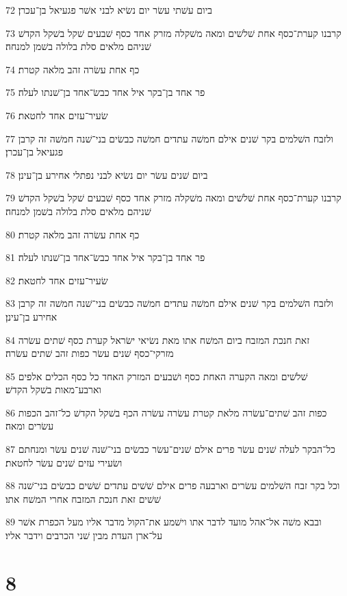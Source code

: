 \par 72 ביום עשׁתי עשׂר יום נשׂיא לבני אשׁר פגעיאל בן־עכרן׃
\par 73 קרבנו קערת־כסף אחת שׁלשׁים ומאה משׁקלה מזרק אחד כסף שׁבעים שׁקל בשׁקל הקדשׁ שׁניהם מלאים סלת בלולה בשׁמן למנחה׃
\par 74 כף אחת עשׂרה זהב מלאה קטרת׃
\par 75 פר אחד בן־בקר איל אחד כבשׂ־אחד בן־שׁנתו לעלה׃
\par 76 שׂעיר־עזים אחד לחטאת׃
\par 77 ולזבח השׁלמים בקר שׁנים אילם חמשׁה עתדים חמשׁה כבשׂים בני־שׁנה חמשׁה זה קרבן פגעיאל בן־עכרן׃
\par 78 ביום שׁנים עשׂר יום נשׂיא לבני נפתלי אחירע בן־עינן׃
\par 79 קרבנו קערת־כסף אחת שׁלשׁים ומאה משׁקלה מזרק אחד כסף שׁבעים שׁקל בשׁקל הקדשׁ שׁניהם מלאים סלת בלולה בשׁמן למנחה׃
\par 80 כף אחת עשׂרה זהב מלאה קטרת׃
\par 81 פר אחד בן־בקר איל אחד כבשׂ־אחד בן־שׁנתו לעלה׃
\par 82 שׂעיר־עזים אחד לחטאת׃
\par 83 ולזבח השׁלמים בקר שׁנים אילם חמשׁה עתדים חמשׁה כבשׂים בני־שׁנה חמשׁה זה קרבן אחירע בן־עינן׃
\par 84 זאת חנכת המזבח ביום המשׁח אתו מאת נשׂיאי ישׂראל קערת כסף שׁתים עשׂרה מזרקי־כסף שׁנים עשׂר כפות זהב שׁתים עשׂרה׃
\par 85 שׁלשׁים ומאה הקערה האחת כסף ושׁבעים המזרק האחד כל כסף הכלים אלפים וארבע־מאות בשׁקל הקדשׁ׃
\par 86 כפות זהב שׁתים־עשׂרה מלאת קטרת עשׂרה עשׂרה הכף בשׁקל הקדשׁ כל־זהב הכפות עשׂרים ומאה׃
\par 87 כל־הבקר לעלה שׁנים עשׂר פרים אילם שׁנים־עשׂר כבשׂים בני־שׁנה שׁנים עשׂר ומנחתם ושׂעירי עזים שׁנים עשׂר לחטאת׃
\par 88 וכל בקר זבח השׁלמים עשׂרים וארבעה פרים אילם שׁשׁים עתדים שׁשׁים כבשׂים בני־שׁנה שׁשׁים זאת חנכת המזבח אחרי המשׁח אתו׃
\par 89 ובבא משׁה אל־אהל מועד לדבר אתו וישׁמע את־הקול מדבר אליו מעל הכפרת אשׁר על־ארן העדת מבין שׁני הכרבים וידבר אליו׃

\chapter{8}

